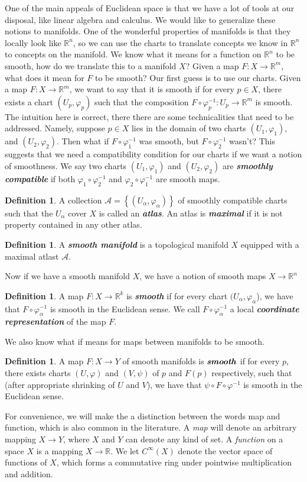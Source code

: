 \documentclass[psamsfonts]{amsart}
\theoremstyle{definition}
\newtheorem{defn}[thm]{Definition}
\theoremstyle{remark}
\newcommand{\R}{\mathbb{R}}
\newcommand{\ib}[1]{\textbf{\textit{#1}}}
\newcommand{\inv}{^{-1}}
\newcommand{\set}[1]{\left\lbrace #1 \right\rbrace}
\begin{document}
%
One of the main appeals of Euclidean space is that we have a lot of tools at our disposal, like linear algebra
and calculus. We would like to generalize these notions to manifolds. One of the wonderful properties of
manifolds is that they locally look like $\R^n$, so we can use the charts to translate concepts we know in
$\R^n$ to concepts on the manifold.
%
We know what it means for a function on $\R^n$ to be smooth, how do we
translate this to a manifold $X$? Given a map $F : X \to \R^m$, what does it mean for $F$ to be smooth? Our
first guess is to use our charts. Given a map $F: X \to \R^m$, we want
to say that it is smooth if for every $p \in X$, there exists a chart
$(U_p, \varphi_p)$ such that the composition
$F \circ \varphi_p\inv : U_p \to \R^m$ is smooth. The intuition here
is correct, there there are some technicalities that need to be addressed.
 Namely, suppose $p \in X$ lies in the domain of two charts
 $(U_1, \varphi_1)$, and $(U_2, \varphi_2)$. Then what if
 $F \circ \varphi_1\inv$ was smooth, but $F \circ \varphi_2\inv$ wasn't?
 This suggests that we need a compatibility condition for our charts
 if we want a notion of smoothness. We say two charts $(U_1, \varphi_1)$
 and $(U_2, \varphi_2)$ are \ib{smoothly compatible} if both
 $\varphi_1 \circ \varphi_2\inv$ and $\varphi_2 \circ \varphi_1\inv$ are
 smooth maps.
 \begin{defn}
	 A collection $\mathcal{A} = \set{(U_\alpha, \varphi_\alpha)}$ of
	 smoothly compatible charts such that the $U_\alpha$ cover $X$ is called
	 an \ib{atlas}. An atlas is \ib{maximal} if it is not property contained in any other atlas.
 \end{defn}
%
\begin{defn}
	A \ib{smooth manifold} is a topological manifold $X$ equipped with a maximal atlast $\mathcal{A}$.
\end{defn}
%
Now if we have a smooth manifold $X$, we have a notion of smooth maps
$X \to \R^n$
%
\begin{defn}
	A map $F : X \to \R^k$ is \ib{smooth} if for every chart
	$(U_\alpha, \varphi_\alpha$), we have that $F \circ \varphi_\alpha\inv$ is
	smooth in the Euclidean sense. We call $F \circ \varphi_\alpha\inv$ a local
	\ib{coordinate representation} of the map $F$.
\end{defn}
%
We also know what if means for maps between manifolds to be smooth.
%
\begin{defn}
	A map $F : X \to Y$ of smooth manifolds is $\ib{smooth}$ if for every $p$,
	there exists charts $(U, \varphi)$ and $(V, \psi)$ of $p$ and $F(p)$
	respectively, such that (after appropriate shrinking of $U$ and $V$), we
	have that $\psi \circ F \circ \varphi\inv$ is smooth in the Euclidean sense.
\end{defn}
%
For convenience, we will make the a distinction between the words map
and function, which is also common in the literature. A \emph{map} will denote
an arbitrary mapping $X \to Y$, where $X$ and $Y$ can denote any kind of set.
A \emph{function} on a space $X$ is a mapping $X \to \R$. We let $C^\infty(X)$
denote the vector space of functions of $X$, which forms a commutative ring
under pointwise multiplication and addition.\\
\end{document}
